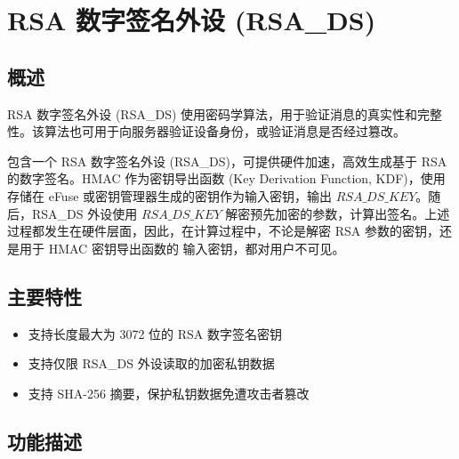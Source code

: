 \documentclass[main\_\_CN.tex]{subfiles}
\begin{document}

\ifglobal
\else
    {\let\clearpage\relax \listoftodos}
    {\let\clearpage\relax \listofdonetodos}
    \tableofcontents
\fi



\chapter{RSA 数字签名外设 (RSA\_DS)}
\label{mod:digsig}
\hypertarget{digsig}{}\hypertarget{rsads}{}

\section{概述}

RSA 数字签名外设 (RSA\_DS) 使用密码学算法，用于验证消息的真实性和完整性。该算法也可用于向服务器验证设备身份，或验证消息是否经过篡改。

\chipname{} 包含一个 RSA 数字签名外设 (RSA\_DS)，可提供硬件加速，高效生成基于 RSA 的数字签名。HMAC 作为密钥导出函数 (Key Derivation Function, KDF)，使用存储在 eFuse 或密钥管理器生成的密钥作为输入密钥，输出 \begin{math}RSA\_DS\_KEY\end{math}。随后，RSA\_DS 外设使用 \begin{math}RSA\_DS\_KEY\end{math} 解密预先加密的参数，计算出签名。上述过程都发生在硬件层面，因此，在计算过程中，不论是解密 RSA 参数的密钥，还是用于 HMAC 密钥导出函数的
输入密钥，都对用户不可见。

\section{主要特性}

\begin{itemize}
\item 支持长度最大为 3072 位的 RSA 数字签名密钥
\item 支持仅限 RSA\_DS 外设读取的加密私钥数据
\item 支持 SHA-256 摘要，保护私钥数据免遭攻击者篡改
\end{itemize}


\section{功能描述}
\end{document}

